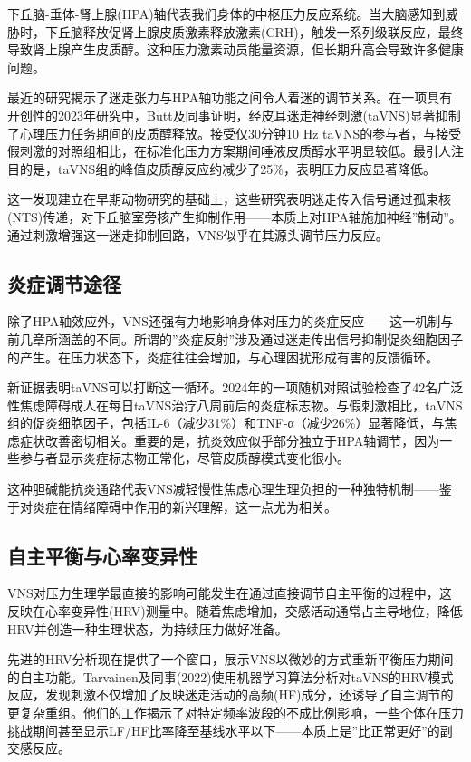 \documentclass[
  Letterpaper,
]{scrbook}
\begin{document}
下丘脑-垂体-肾上腺(HPA)轴代表我们身体的中枢压力反应系统。当大脑感知到威胁时，下丘脑释放促肾上腺皮质激素释放激素(CRH)，触发一系列级联反应，最终导致肾上腺产生皮质醇。这种压力激素动员能量资源，但长期升高会导致许多健康问题。

最近的研究揭示了迷走张力与HPA轴功能之间令人着迷的调节关系。在一项具有开创性的2023年研究中，Butt及同事证明，经皮耳迷走神经刺激(taVNS)显著抑制了心理压力任务期间的皮质醇释放。接受仅30分钟10
Hz
taVNS的参与者，与接受假刺激的对照组相比，在标准化压力方案期间唾液皮质醇水平明显较低。最引人注目的是，taVNS组的峰值皮质醇反应约减少了25\%，表明压力反应显著降低。

这一发现建立在早期动物研究的基础上，这些研究表明迷走传入信号通过孤束核(NTS)传递，对下丘脑室旁核产生抑制作用------本质上对HPA轴施加神经''制动''。通过刺激增强这一迷走抑制回路，VNS似乎在其源头调节压力反应。

\subsection{炎症调节途径}\label{ux708eux75c7ux8c03ux8282ux9014ux5f84}

除了HPA轴效应外，VNS还强有力地影响身体对压力的炎症反应------这一机制与前几章所涵盖的不同。所谓的''炎症反射''涉及通过迷走传出信号抑制促炎细胞因子的产生。在压力状态下，炎症往往会增加，与心理困扰形成有害的反馈循环。

新证据表明taVNS可以打断这一循环。2024年的一项随机对照试验检查了42名广泛性焦虑障碍成人在每日taVNS治疗八周前后的炎症标志物。与假刺激相比，taVNS组的促炎细胞因子，包括IL-6（减少31\%）和TNF-α（减少26\%）显著降低，与焦虑症状改善密切相关。重要的是，抗炎效应似乎部分独立于HPA轴调节，因为一些参与者显示炎症标志物正常化，尽管皮质醇模式变化很小。

这种胆碱能抗炎通路代表VNS减轻慢性焦虑心理生理负担的一种独特机制------鉴于对炎症在情绪障碍中作用的新兴理解，这一点尤为相关。

\subsection{自主平衡与心率变异性}\label{ux81eaux4e3bux5e73ux8861ux4e0eux5fc3ux7387ux53d8ux5f02ux6027}

VNS对压力生理学最直接的影响可能发生在通过直接调节自主平衡的过程中，这反映在心率变异性(HRV)测量中。随着焦虑增加，交感活动通常占主导地位，降低HRV并创造一种生理状态，为持续压力做好准备。

先进的HRV分析现在提供了一个窗口，展示VNS以微妙的方式重新平衡压力期间的自主功能。Tarvainen及同事(2022)使用机器学习算法分析对taVNS的HRV模式反应，发现刺激不仅增加了反映迷走活动的高频(HF)成分，还诱导了自主调节的更复杂重组。他们的工作揭示了对特定频率波段的不成比例影响，一些个体在压力挑战期间甚至显示LF/HF比率降至基线水平以下------本质上是''比正常更好''的副交感反应。
\end{document}
